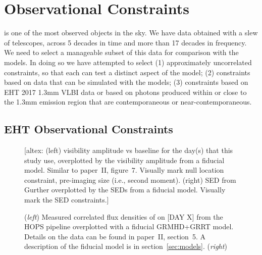 \section{Observational Constraints}\label{sec:observations}
\sgra is one of the most observed objects in the sky.
We have data obtained with a slew of telescopes, across 5 decades in time and more than 17 decades in frequency. We need to select a manageable subset of this data for comparison with the models. In doing so we have attempted to select (1) approximately uncorrelated constraints, so that each can test a distinct aspect of the model; (2) constraints based on data that can be simulated with the models; (3) constraints based on EHT 2017 1.3mm VLBI data or based on photons produced within or close to the 1.3mm emission region that are contemporaneous or near-contemporaneous.


\subsection{EHT Observational Constraints}


\begin{figure*}
  \centering
  [altex: (left) visibility amplitude vs baseline for the day(s) that
    this study use, overplotted by the visibility amplitude from a
    fiducial model.
    Similar to paper~II, figure~7.
    Visually mark null location constraint, pre-imaging size (i.e.,
    second moment).
    (right) SED from Gurther overplotted by the SEDs from a fiducial
    model.
    Visually mark the SED constraints.]
  \caption{(\emph{left}) Measured correlated flux densities of \sgra
    on [DAY X] from the HOPS pipeline overplotted with a fiducial
    GRMHD+GRRT model.
    Details on the data can be found in paper~II, section~5.
    A description of the fiducial model is in
    section~\ref{sec:models}.
    (\emph{right}) }
  \label{fig:visibility}
\end{figure*}

